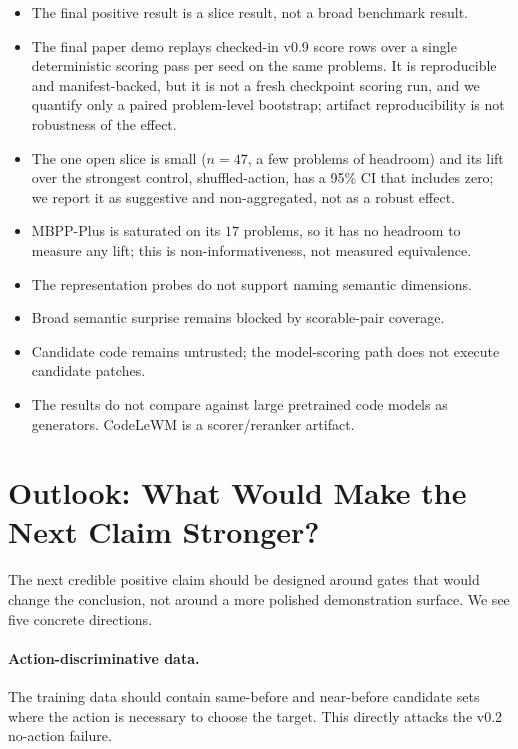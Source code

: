 \documentclass[11pt]{article}
\newcommand{\modelname}{CodeLeWM}
\begin{document}
\begin{itemize}[leftmargin=1.5em]
  \item The final positive result is a slice result, not a broad benchmark
  result.
  \item The final paper demo replays checked-in v0.9 score rows over a single
  deterministic scoring pass per seed on the same problems. It is reproducible and
  manifest-backed, but it is not a fresh checkpoint scoring run, and we quantify
  only a paired problem-level bootstrap; artifact reproducibility is not
  robustness of the effect.
  \item The one open slice is small ($n=47$, a few problems of headroom) and its
  lift over the strongest control, shuffled-action, has a 95\% CI that includes
  zero; we report it as suggestive and non-aggregated, not as a robust effect.
  \item MBPP-Plus is saturated on its $17$ problems, so it has no headroom to
  measure any lift; this is non-informativeness, not measured equivalence.
  \item The representation probes do not support naming semantic dimensions.
  \item Broad semantic surprise remains blocked by scorable-pair coverage.
  \item Candidate code remains untrusted; the model-scoring path does not
  execute candidate patches.
  \item The results do not compare against large pretrained code models as
  generators. \modelname{} is a scorer/reranker artifact.
\end{itemize}

\section{Outlook: What Would Make the Next Claim Stronger?}

The next credible positive claim should be designed around gates that would
change the conclusion, not around a more polished demonstration surface. We see
five concrete directions.

\paragraph{Action-discriminative data.}
The training data should contain same-before and near-before candidate sets
where the action is necessary to choose the target. This directly attacks the
v0.2 no-action failure.
\end{document}
